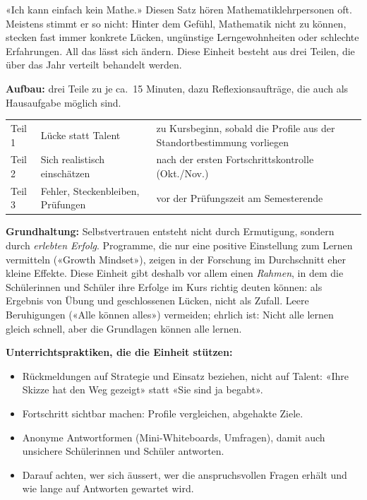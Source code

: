 \documentclass[11pt]{exam}
\begin{document}

«Ich kann einfach kein Mathe.» Diesen Satz hören Mathematiklehrpersonen oft.
Meistens stimmt er so nicht: Hinter dem Gefühl, Mathematik nicht zu können,
stecken fast immer konkrete Lücken, ungünstige Lerngewohnheiten oder schlechte
Erfahrungen. All das lässt sich ändern. Diese Einheit besteht aus drei Teilen,
die über das Jahr verteilt behandelt werden.

\begin{lehrperson}[Überblick]
\textbf{Aufbau:} drei Teile zu je ca.\ 15 Minuten, dazu Reflexionsaufträge, die
auch als Hausaufgabe möglich sind.

\begin{tabular}{@{}llp{7.2cm}@{}}
  Teil 1 & Lücke statt Talent        & zu Kursbeginn, sobald die Profile aus der Standortbestimmung vorliegen \\
  Teil 2 & Sich realistisch einschätzen & nach der ersten Fortschrittskontrolle (Okt./Nov.) \\
  Teil 3 & Fehler, Steckenbleiben, Prüfungen & vor der Prüfungszeit am Semesterende
\end{tabular}

\textbf{Grundhaltung:} Selbstvertrauen entsteht nicht durch Ermutigung,
sondern durch \emph{erlebten Erfolg}. Programme, die nur eine positive
Einstellung zum Lernen vermitteln («Growth Mindset»), zeigen in der Forschung
im Durchschnitt eher kleine Effekte. Diese Einheit gibt deshalb vor allem einen
\emph{Rahmen}, in dem die Schülerinnen und Schüler ihre Erfolge im Kurs
richtig deuten können: als Ergebnis von Übung und geschlossenen Lücken, nicht
als Zufall. Leere Beruhigungen («Alle können alles») vermeiden; ehrlich ist:
Nicht alle lernen gleich schnell, aber die Grundlagen können alle lernen.

\textbf{Unterrichtspraktiken, die die Einheit stützen:}
\begin{itemize}
  \item Rückmeldungen auf Strategie und Einsatz beziehen, nicht auf Talent:
        «Ihre Skizze hat den Weg gezeigt» statt «Sie sind ja begabt».
  \item Fortschritt sichtbar machen: Profile vergleichen, abgehakte Ziele.
  \item Anonyme Antwortformen (Mini-Whiteboards, Umfragen), damit auch
        unsichere Schülerinnen und Schüler antworten.
  \item Darauf achten, wer sich äussert, wer die anspruchsvollen Fragen
        erhält und wie lange auf Antworten gewartet wird.
\end{itemize}


\end{lehrperson}
\end{document}
